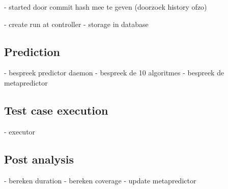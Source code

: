 - started door commit hash mee te geven (doorzoek history ofzo)

- create run at controller
- storage in database

\subsection{Prediction}
- bespreek predictor daemon
- bespreek de 10 algoritmes
- bespreek de metapredictor

\subsection{Test case execution}
- executor

\subsection{Post analysis}
- bereken duration
- bereken coverage
- update metapredictor














